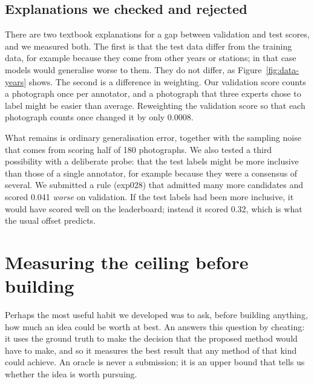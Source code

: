 \subsection{Explanations we checked and rejected}\label{sec:val-rejected}
There are two textbook explanations for a gap between validation and test scores, and we measured
both. The first is that the test data differ from the training data, for example because they come
from other years or stations; in that case models would generalise worse to them. They do not
differ, as Figure~\ref{fig:data-years} shows. The second is a difference in weighting. Our
validation score counts a photograph once per annotator, and a photograph that three experts chose
to label might be easier than average. Reweighting the validation score so that each photograph
counts once changed it by only 0.0008.

What remains is ordinary generalisation error, together with the sampling noise that comes from
scoring half of 180 photographs. We also tested a third possibility with a deliberate probe: that
the test labels might be more inclusive than those of a single annotator, for example because they
were a consensus of several. We submitted a rule (exp028) that admitted many more candidates and
scored 0.041 \emph{worse} on validation. If the test labels had been more inclusive, it would have
scored well on the leaderboard; instead it scored 0.32, which is what the usual offset predicts.

\section{Measuring the ceiling before building}\label{sec:val-oracles}
Perhaps the most useful habit we developed was to ask, before building anything, how much an idea
could be worth at best. An  answers this question by cheating: it uses the ground
truth to make the decision that the proposed method would have to make, and so it measures the best
result that any method of that kind could achieve. An oracle is never a submission; it is an upper
bound that tells us whether the idea is worth pursuing.

